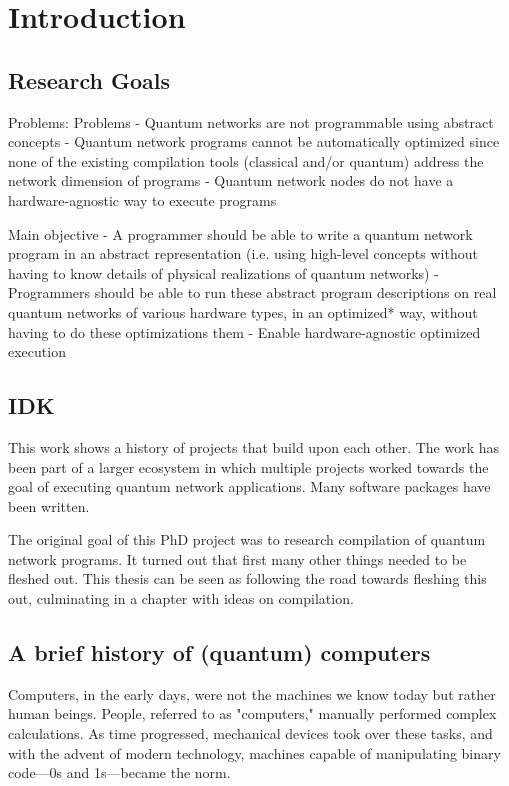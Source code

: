 \chapter{Introduction}
\label{chp:intro}


\section{Research Goals}
Problems:
Problems
- Quantum networks are not programmable using abstract concepts
- Quantum network programs cannot be automatically optimized since none of the existing compilation tools (classical and/or quantum) address the network dimension of programs
- Quantum network nodes do not have a hardware-agnostic way to execute programs

Main objective
- A programmer should be able to write a quantum network program in an abstract representation (i.e. using high-level concepts without having to know details of physical realizations of quantum networks)
- Programmers should be able to run these abstract program descriptions on real quantum networks of various hardware types, in an optimized* way, without having to do these optimizations them
- Enable hardware-agnostic optimized execution


\section{IDK}
This work shows a history of projects that build upon each other.
The work has been part of a larger ecosystem in which multiple projects worked towards the goal of executing quantum network applications.
Many software packages have been written.

The original goal of this PhD project was to research compilation of quantum network programs.
It turned out that first many other things needed to be fleshed out.
This thesis can be seen as following the road towards fleshing this out, culminating in a chapter with ideas on compilation.

\section{A brief history of (quantum) computers}

Computers, in the early days, were not the machines we know today but rather human beings.
People, referred to as "computers," manually performed complex calculations.
As time progressed, mechanical devices took over these tasks, and with the advent of modern technology, machines capable of manipulating binary code—0s and 1s—became the norm.

